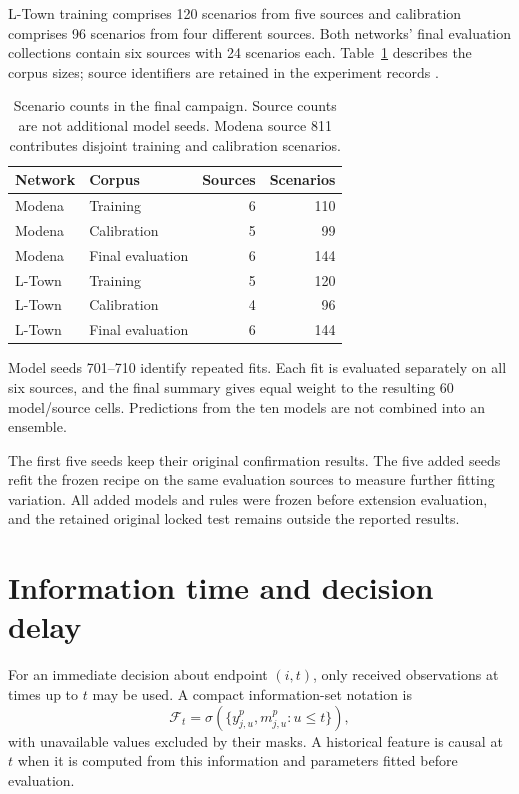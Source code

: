 L-Town training comprises 120 scenarios from five sources and calibration comprises 96 scenarios from four different sources. Both networks' final evaluation collections contain six sources with 24 scenarios each. Table~\ref{tab:corpora} describes the corpus sizes; source identifiers are retained in the experiment records \cite{projectcampaign,projectfinal}.

\begin{table}[tbp]
\centering\small
\caption[Scenario counts in the final campaign]{Scenario counts in the final campaign. Source counts are not additional model seeds. Modena source 811 contributes disjoint training and calibration scenarios.}
\label{tab:corpora}
\begin{tabular}{@{}llrr@{}}
\toprule
Network & Corpus & Sources & Scenarios\\
\midrule
Modena & Training & 6 & 110\\
Modena & Calibration & 5 & 99\\
Modena & Final evaluation & 6 & 144\\
\addlinespace
L-Town & Training & 5 & 120\\
L-Town & Calibration & 4 & 96\\
L-Town & Final evaluation & 6 & 144\\
\bottomrule
\end{tabular}
\end{table}

Model seeds 701--710 identify repeated fits. Each fit is evaluated separately on all six sources, and the final summary gives equal weight to the resulting 60 model/source cells. Predictions from the ten models are not combined into an ensemble.

The first five seeds keep their original confirmation results. The five added seeds refit the frozen recipe on the same evaluation sources to measure further fitting variation. All added models and rules were frozen before extension evaluation, and the retained original locked test remains outside the reported results.


\section{Information time and decision delay}
For an immediate decision about endpoint $(i,t)$, only received observations at times up to $t$ may be used. A compact information-set notation is
\begin{equation}
 \mathcal F_t=\sigma\!\left(\{y^p_{j,u},m^p_{j,u}:u\leq t\}\right),
\end{equation}
with unavailable values excluded by their masks. A historical feature is causal at $t$ when it is computed from this information and parameters fitted before evaluation.

